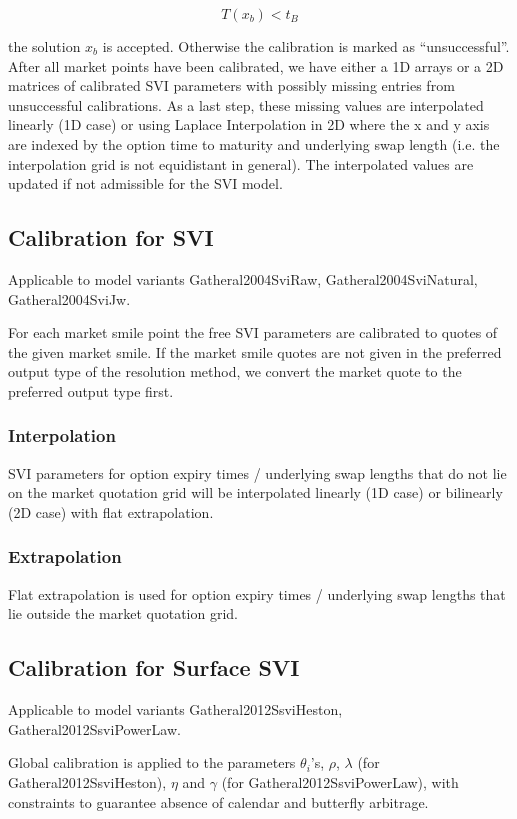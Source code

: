 \documentclass{amsart}
\theoremstyle{plain}
\numberwithin{equation}{section}
\begin{document}
$$
T(x_b) < t_B
$$

the solution $x_b$ is accepted. Otherwise the calibration is marked as ``unsuccessful''. After all market points have been
calibrated, we have either a 1D arrays or a 2D matrices of calibrated SVI
parameters with possibly missing entries from unsuccessful calibrations. As a last step, these missing values are
interpolated linearly (1D case) or using Laplace Interpolation in 2D where the x and y axis are indexed by the option
time to maturity and underlying swap length (i.e. the interpolation grid is not equidistant in general). The
interpolated values are updated if not admissible for the SVI model.

\subsection{Calibration for SVI}

Applicable to model variants Gatheral2004SviRaw, Gatheral2004SviNatural, Gatheral2004SviJw.

For each market smile point the free SVI parameters are calibrated to quotes of the given market smile. If the market
smile quotes are not given in the preferred output type of the resolution method, we convert the market quote to the
preferred output type first.

\subsubsection{Interpolation}

SVI parameters for option expiry times / underlying swap lengths that do not lie on the market quotation grid will be
interpolated linearly (1D case) or bilinearly (2D case) with flat extrapolation.

\subsubsection{Extrapolation} Flat extrapolation is used for option expiry times / underlying swap lengths that lie outside the market quotation grid.

\subsection{Calibration for Surface SVI}

Applicable to model variants Gatheral2012SsviHeston, Gatheral2012SsviPowerLaw.

Global calibration is applied to the parameters $\theta_i$'s, $\rho$, $\lambda$ (for Gatheral2012SsviHeston), $\eta$ and $\gamma$ (for Gatheral2012SsviPowerLaw),
with constraints to guarantee absence of calendar and butterfly arbitrage.
\end{document}
